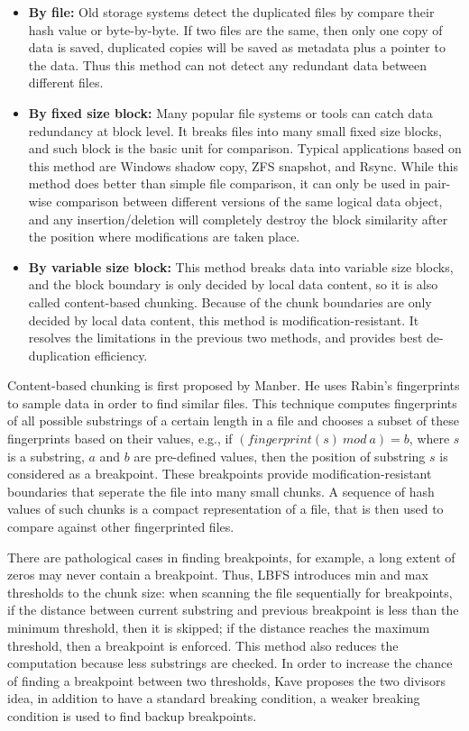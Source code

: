 \begin{itemize}
\item \textbf{By file:} Old storage systems detect the duplicated files by compare their hash value
or byte-by-byte. If two files are the same, then only one copy of data is saved, duplicated
copies will be saved as metadata plus a pointer to the data. Thus this method can not detect any redundant data
between different files.

\item \textbf{By fixed size block:} Many popular file systems or tools can catch data redundancy at block level.
It breaks files into many small fixed size blocks, and such block is the basic unit 
for comparison. Typical applications based on this method are Windows shadow copy, ZFS\cite{zfs} snapshot, and Rsync\cite{rsync}. 
While this method does better than simple file comparison, it can only be used in pair-wise comparison
between different versions of
the same logical data object, and any insertion/deletion will completely destroy the block similarity after the position
where modifications are taken place.

\item \textbf{By variable size block:} This method breaks data into variable size blocks, and the block boundary
is only decided by local data content, so it is also called content-based chunking. 
Because of the chunk boundaries are only decided by local data content,
this method is modification-resistant. It resolves the
limitations in the previous two methods, and provides
best de-duplication efficiency. 
\end{itemize} 

Content-based chunking is first proposed by Manber\cite{similar94}.
He uses Rabin's fingerprints\cite{rabin81, identify00} to sample
data in order to find similar files. This technique computes
fingerprints of all possible substrings of a certain
length in a file and chooses a subset of these fingerprints
based on their values,  e.g., if $(fingerprint(s)\ mod\ a) = b$, where
$s$ is a substring,
$a$ and $b$ are pre-defined values, then the position of substring $s$
is considered as a breakpoint. 
These breakpoints provide 
modification-resistant boundaries that seperate the file
into many small chunks. A sequence of hash values of such chunks
is a compact representation of a file, that is then used to compare
against other fingerprinted files.

There are pathological cases in finding breakpoints, for example,
a long extent of zeros may never contain a breakpoint. Thus, LBFS\cite{lbfs01}
introduces min and max thresholds to the chunk size: when scanning the file
sequentially for breakpoints, if the distance between current substring 
and previous breakpoint is less than the minimum threshold, then it is skipped;
if the distance reaches the maximum threshold, then a breakpoint
is enforced. This method also reduces the computation because less substrings
are checked. In order to increase the chance of finding a breakpoint between
two thresholds, Kave\cite{frame05}
proposes the two divisors idea, in addition to have a standard breaking condition,
a weaker breaking condition is used to find backup breakpoints.

